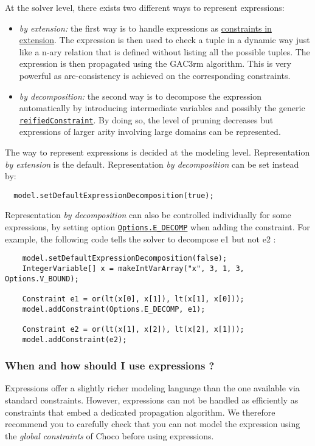 At the solver level, there exists two different ways to represent expressions:
\begin{itemize}
\item \emph{by extension:} the first way is to handle expressions as \hyperlink{model:arbitraryconstraintsinextension}{constraints in extension}. The expression is then used to check a tuple in a dynamic way just like a n-ary relation that is defined without listing all the possible tuples. The expression is then propagated using the GAC3rm algorithm. This is very powerful as arc-consistency is achieved on the corresponding constraints.
\item \emph{by decomposition:} the second way is to decompose the expression automatically by introducing intermediate variables and possibly the generic \hyperlink{reifiedconstraint:reifiedconstraintconstraint}{\tt reifiedConstraint}. By doing so, the level of pruning decreases but expressions of larger arity involving large domains can be represented.
\end{itemize}
The way to represent expressions is decided at the modeling level. Representation \emph{by extension} is the default. Representation \emph{by decomposition} can be set instead by:
\begin{lstlisting}
  model.setDefaultExpressionDecomposition(true);
\end{lstlisting}

Representation \emph{by decomposition} can also be controlled individually for some expressions, by setting option \hyperlink{edecomp:edecompoptions}{\tt Options.E\_DECOMP} when adding the constraint.
For example, the following code tells the solver to decompose e1 but not e2 :
\begin{lstlisting}
	model.setDefaultExpressionDecomposition(false);
	IntegerVariable[] x = makeIntVarArray("x", 3, 1, 3, Options.V_BOUND);

	Constraint e1 = or(lt(x[0], x[1]), lt(x[1], x[0]));
	model.addConstraint(Options.E_DECOMP, e1);
	
	Constraint e2 = or(lt(x[1], x[2]), lt(x[2], x[1]));
	model.addConstraint(e2);
\end{lstlisting}

\subsubsection{When and how should I use expressions ?}\label{model:whenshouldiuseexpressions}\hypertarget{model:whenshouldiuseexpressions}{}
Expressions offer a slightly richer modeling language than the one available via standard constraints. However, expressions 
can not be handled as efficiently as constraints that embed a dedicated propagation algorithm. We therefore
recommend you to carefully check that you can not model the expression using the \emph{global constraints} of Choco before using
expressions.

